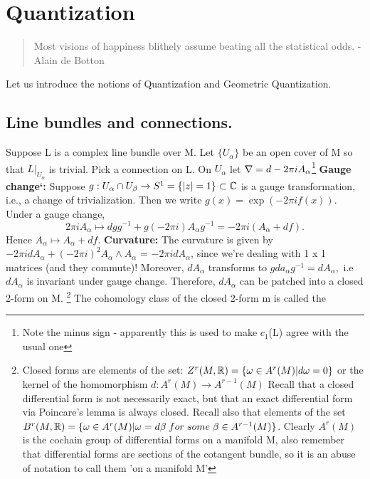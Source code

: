 \section{Quantization}
\begin{quotation}
 Most visions of happiness blithely assume beating all the statistical odds.  - Alain de Botton
\end{quotation}

Let us introduce the notions of Quantization and Geometric Quantization.
\subsection{Line bundles and connections.}
Suppose L is a complex line bundle over M. Let $\lbrace U_{\alpha} \rbrace$ be an open cover of M so that
$L|_{U_{\alpha}}$ is trivial. Pick a connection \nab on L. On $U_\alpha$ let $\nabla = d - 2 \pi i A_{\alpha}
$\footnote{Note the minus sign - apparently this is used to make $c_1$(L) agree with the usual one}
\textbf{Gauge change`:} Suppose $g: U_\alpha \cap U_\beta \rightarrow  S^1 = \lbrace |z| = 1 \rbrace \subset \mathbb{C}$ is
a gauge transformation, i.e., a change of trivialization. Then we write $g(x) = \exp(-2\pi i f(x))$. Under a gauge change,
\begin{equation*}
 2 \pi i A_{\alpha} \mapsto dgg^{-1} + g(-2\pi i)A_{\alpha} g^{-1} = -2 \pi i(A_{\alpha} + df).
\end{equation*}
Hence $A_\alpha \mapsto A_\alpha + df$.
\textbf{Curvature:} The curvature is given by $-2\pi i d A_{\alpha}+ (-2\pi i)^2 A_\alpha \wedge A_\alpha$ = $-2\pi i d A_{\alpha}$,
since we're dealing with 1 x 1 matrices (and they commute)! Moreover, $d A_\alpha$ transforms to $g d a_{\alpha} g^{-1}
= d A_\alpha,$ i.e $d A_\alpha$ is invariant under gauge change. Therefore, {$d A_\alpha$} can be patched into a closed 2-form
on M.
\footnote{Closed forms are elements of the set: $Z^r(M,\mathbb{R}) = \lbrace \omega \in A^r(M)| d\omega = 0 \rbrace$ or the kernel of the homomorphism 
$d:A^r(M) \rightarrow A^{r-1}(M)$ Recall that a closed differential form is not necessarily exact, but that an exact differential
form via Poincare's lemma is always closed. Recall also that elements of the set $B^r(M,\mathbb{R}) = \lbrace \omega \in A^{r}(M) |
\omega = d\beta\; for\;some\;\beta \in A^{r-1}(M)\rbrace$. Clearly $A^{r}(M)$ is the cochain group of differential forms
on a manifold M, also remember that differential forms are sections of the cotangent bundle, so it is an abuse of notation
to call them 'on a manifold M'} The cohomology class of the closed 2-form m is called the 
